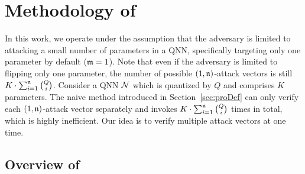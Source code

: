 \section{Methodology of \tool}\label{sec:method}

In this work, we operate under the assumption that the adversary is limited to attacking a small number of parameters in a QNN, specifically targeting only one parameter by default ($\mathfrak{m}=1$). 
Note that even if the adversary is limited to flipping only one parameter, the number of possible $(1,\mathfrak{n})$-attack vectors is still $K\cdot\sum_{i=1}^{\mathfrak{n}}\binom{Q}{i}$.
% 
Consider a QNN ${\mathcal{N}}$ which is quantized by $Q$ and comprises $K$ parameters. The naive method introduced in Section~\ref{sec:proDef} can only verify each $(1,\mathfrak{n})$-attack vector separately and invokes $K\cdot\sum_{i=1}^{\mathfrak{n}}\binom{Q}{i}$ times \deepPoly in total, which is highly inefficient. Our idea is to verify multiple attack vectors at one time. 



\subsection{Overview of \tool}


